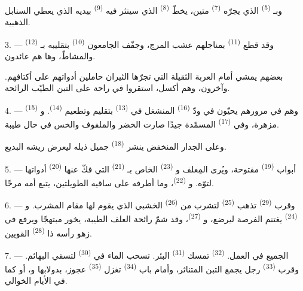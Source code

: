 وبـ \textsuperscript{(5)} الذي يجرّه  \textsuperscript{(7)}
متين، يخطّ  \textsuperscript{(8)} الذي سينثر فيه 
\textsuperscript{(9)} بيديه  الذي يعطي السنابل الذهبية.

3. --- وقد قطع  \textsuperscript{(11)} بمناجلهم عشب المرج،
وجفّف الجامعون  \textsuperscript{(10)} بتقليبه بـ
\textsuperscript{(12)} والمشاطّ، وها هم عائدون.

بعضهم يمشي أمام العربة الثقيلة التي تجرّها الثيران حاملين أدواتهم على
أكتافهم. وآخرون، وهم أكسل، استقروا في راحة على التبن الطيّب الرائحة.

4. --- وهم في مرورهم يحيّون في ودّ  \textsuperscript{(16)}
المنشغل في  \textsuperscript{(13)} بتقليم 
وتطعيم  \textsuperscript{(14)}. و
\textsuperscript{(15)} مزهرة، وفي  \textsuperscript{(17)} المسمّدة
جيدًا صارت الخضر والملفوف والخس في حال طيبة.

وعلى الجدار المنخفض ينشر  \textsuperscript{(18)} جميل ذيله ليعرض
ريشه البديع.

\VUsaut{3.0mm}

5. --- أبواب  \textsuperscript{(19)} مفتوحة، ويُرى المِعلف
و \textsuperscript{(23)} الخاص بـ \textsuperscript{(21)}
التي فكّ عنها  \textsuperscript{(20)} أدواتها لتوّه. و
\textsuperscript{(22)}، وما أطرفه على ساقيه الطويلتين، يتبع أمه مرحًا.

6. --- وقرب  \textsuperscript{(29)} تذهب 
\textsuperscript{(25)} لتشرب من  \textsuperscript{(26)} الخشبي الذي
يقوم لها مقام المشرب. و \textsuperscript{(24)} يغتنم الفرصة
ليرضع، و \textsuperscript{(27)}، وقد شمّ رائحة العلف الطيبة، يخور
مبتهجًا ويرفع في زهو رأسه ذا  \textsuperscript{(28)} القويين.

7. --- الجميع في العمل.  \textsuperscript{(32)} تمسك 
\textsuperscript{(31)} البئر. تسحب الماء في  \textsuperscript{(30)} لتسقي
البهائم. وقرب  \textsuperscript{(33)} رجل يجمع التبن المتناثر،
وأمام باب  \textsuperscript{(34)} تغزل 
\textsuperscript{(35)} عجوز، بدولابها و،  أو
 كما في الأيام الخوالي.

